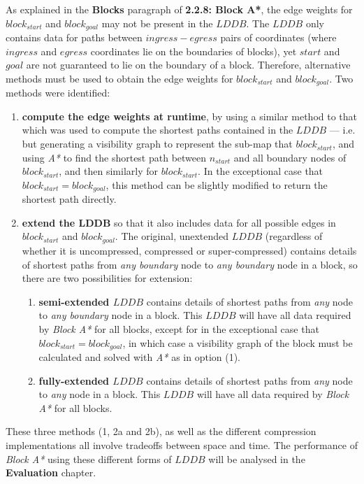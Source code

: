 \documentclass[12pt,notitlepage]{report}
\begin{document}
\noindent
As explained in the {\bfseries Blocks} paragraph of {\bfseries 2.2.8: Block A*}, the edge weights for $block_{start}$ and $block_{goal}$ may not be present in the $LDDB$. The $LDDB$ only contains data for paths between $ingress-egress$ pairs of coordinates (where $ingress$ and $egress$ coordinates lie on the boundaries of blocks), yet $start$ and $goal$ are not guaranteed to lie on the boundary of a block. Therefore, alternative methods must be used to obtain the edge weights for $block_{start}$ and $block_{goal}$. Two methods were identified:
\begin{enumerate}
\item {\bfseries compute the edge weights at runtime}, by using a similar method to that which was used to compute the shortest paths contained in the $LDDB$ --- i.e. but generating a visibility graph to represent the sub-map that $block_{start}$, and using {\em A*} to find the shortest path between $n_{start}$ and all boundary nodes of $block_{start}$, and then similarly for $block_{start}$. In the exceptional case that $block_{start} = block_{goal}$, this method can be slightly modified to return the shortest path directly. 
\item{\bfseries extend the LDDB} so that it also includes data for all possible edges in $block_{start}$ and $block_{goal}$. The original, unextended $LDDB$ (regardless of whether it is uncompressed, compressed or super-compressed) contains details of shortest paths from {\em any boundary} node to {\em any boundary} node in a block, so there are two possibilities for extension:
  \begin{enumerate}
  \item{\bf semi-extended $LDDB$} contains details of shortest paths from {\em any} node to {\em any boundary} node in a block. This $LDDB$ will have all data required by {\em Block A*} for all blocks, except for in the exceptional case that $block_{start} = block_{goal}$, in which case a visibility graph of the block must be calculated and solved with {\em A*} as in option (1).
  \item{\bf fully-extended $LDDB$} contains details of shortest paths from {\em any} node to {\em any} node in a block. This $LDDB$ will have all data required by {\em Block A*} for all blocks.
  \end{enumerate} 
\end{enumerate}

\noindent
These three methods (1, 2a and 2b), as well as the different compression implementations all involve tradeoffs between space and time. The performance of {\em Block A*} using these different forms of $LDDB$ will be analysed in the {\bfseries Evaluation} chapter.\\
\end{document}
